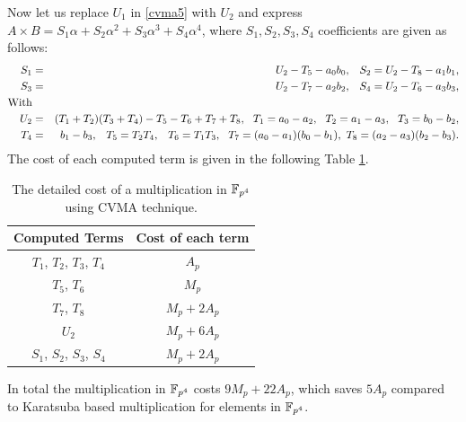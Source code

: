 Now let us replace $U_1$ in \eqref{cvma5} with $U_2$ and express $A\times B=S_1\alpha+S_2\alpha^2+S_3\alpha^3+S_4\alpha^4$, where $S_1,S_2,S_3,S_4$ coefficients are given as follows:
\begin{eqnarray*}
{S_1}&=&U_2-T_5-a_0b_0,\ \ \hspace{0.5mm}S_2=U_2-T_8-a_1b_1, \\ 
S_3&=&U_2-T_7-a_2b_2, \ \ \hspace{0.5mm} S_4=U_2-T_6-a_3b_3,\\
\text{With}\\
U_2&=&(T_1+T_2)(T_3+T_4)-T_5-T_6+T_7+T_8,\ \
T_1=a_0-a_2,\ \ T_2=a_1-a_3,\ \ T_3=b_0-b_2,\\
T_4&=&b_1-b_3,\ \  \hspace{0.5mm}T_5=T_2T_4,\ \ \hspace{0.5mm}T_6=T_1T_3,\ \
T_7=(a_0-a_1)(b_0-b_1),\
T_8=(a_2-a_3)(b_2-b_3).
\end{eqnarray*}
The cost of each computed term is given in the following Table \ref{tab_cmva_mul_cost}.
\renewcommand{\baselinestretch}{1.2}
\begin{table}[ht]
	\centering
	\caption{The detailed cost of a multiplication in $\mathbb{F}_{p^4}$ using CVMA technique.}
	\label{tab_cmva_mul_cost}
	\begin{tabular}{|c|c|}
		\hline
		 Computed  Terms & Cost of each term      \\ 
		 \hline
		$T_1$, $T_2$, $T_3$, $T_4$   & $ A_p$    \\ \hline
		$T_5$, $T_6$            &  $ M_p$     \\ \hline
		$T_7$, $T_8$          & $M_p+2A_p$   \\ \hline
		$U_2$ & $M_p+6A_p$ \\ \hline
		$S_1$, $S_2$, $S_3$, $S_4$ & $ M_p+2A_p$\\ \hline
	\end{tabular}
\end{table}
\renewcommand{\baselinestretch}{1.0}
In total the multiplication in $\mathbb{F}_{p^4}$ costs $9M_p+22A_p$, which saves $5A_p$ compared to Karatsuba based multiplication for elements in $\mathbb{F}_{p^4}$.


